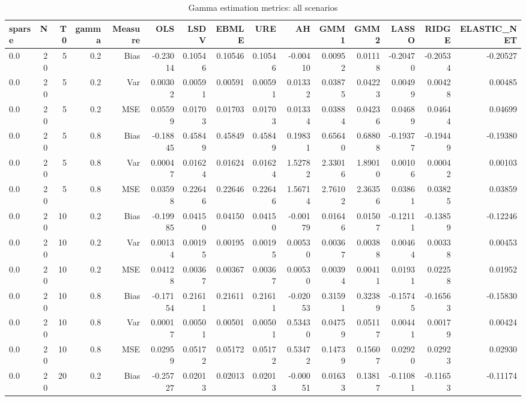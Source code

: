 \begin{table}[!htbp]\centering
\caption{Gamma estimation metrics: all scenarios}
\label{tab:table1_all_scenarios}
\begin{tabular}{lrrrrrrrrrrrrrr}
\hline
sparse & N & T0 & gamma & Measure & OLS & LSDV & EBMLE & URE & AH & GMM1 & GMM2 & LASSO & RIDGE & ELASTIC_NET \\
\hline
0.0 &  20 &  5 & 0.2 & Bias & -0.23014 & 0.10546 & 0.10546 & 0.10546 & -0.00410 & 0.00952 & 0.01118 & -0.20470 & -0.20534 & -0.20527 \\
0.0 &  20 &  5 & 0.2 & Var & 0.00302 & 0.00591 & 0.00591 & 0.00591 & 0.01332 & 0.03875 & 0.04223 & 0.00499 & 0.00428 & 0.00485 \\
0.0 &  20 &  5 & 0.2 & MSE & 0.05599 & 0.01703 & 0.01703 & 0.01703 & 0.01334 & 0.03884 & 0.04236 & 0.04689 & 0.04644 & 0.04699 \\
0.0 &  20 &  5 & 0.8 & Bias & -0.18845 & 0.45849 & 0.45849 & 0.45849 & 0.19831 & 0.65640 & 0.68808 & -0.19377 & -0.19449 & -0.19380 \\
0.0 &  20 &  5 & 0.8 & Var & 0.00047 & 0.01624 & 0.01624 & 0.01624 & 1.52782 & 2.33016 & 1.89010 & 0.00106 & 0.00042 & 0.00103 \\
0.0 &  20 &  5 & 0.8 & MSE & 0.03598 & 0.22646 & 0.22646 & 0.22646 & 1.56714 & 2.76102 & 2.36356 & 0.03861 & 0.03825 & 0.03859 \\
0.0 &  20 & 10 & 0.2 & Bias & -0.19985 & 0.04150 & 0.04150 & 0.04150 & -0.00179 & 0.01646 & 0.01507 & -0.12111 & -0.13859 & -0.12246 \\
0.0 &  20 & 10 & 0.2 & Var & 0.00134 & 0.00195 & 0.00195 & 0.00195 & 0.00530 & 0.00367 & 0.00388 & 0.00464 & 0.00338 & 0.00453 \\
0.0 &  20 & 10 & 0.2 & MSE & 0.04128 & 0.00367 & 0.00367 & 0.00367 & 0.00530 & 0.00394 & 0.00411 & 0.01931 & 0.02258 & 0.01952 \\
0.0 &  20 & 10 & 0.8 & Bias & -0.17154 & 0.21611 & 0.21611 & 0.21611 & -0.02053 & 0.31591 & 0.32389 & -0.15745 & -0.16563 & -0.15830 \\
0.0 &  20 & 10 & 0.8 & Var & 0.00017 & 0.00501 & 0.00501 & 0.00501 & 0.53430 & 0.04759 & 0.05117 & 0.00441 & 0.00179 & 0.00424 \\
0.0 &  20 & 10 & 0.8 & MSE & 0.02959 & 0.05172 & 0.05172 & 0.05172 & 0.53472 & 0.14739 & 0.15607 & 0.02920 & 0.02923 & 0.02930 \\
0.0 &  20 & 20 & 0.2 & Bias & -0.25727 & 0.02013 & 0.02013 & 0.02013 & -0.00051 & 0.01633 & 0.13817 & -0.11081 & -0.11653 & -0.11174 \\

\end{tabular}
\end{table}
